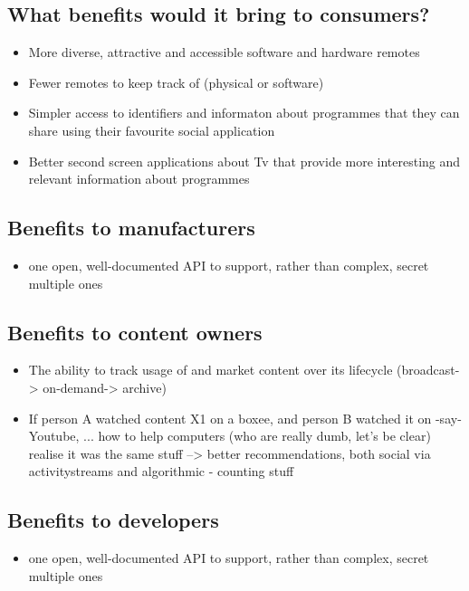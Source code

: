 \documentclass[]{article}%
\begin{document}
\subsection{What benefits would it bring to consumers?}

\begin{itemize}
\item{More diverse, attractive and accessible software and hardware remotes}
\item{Fewer remotes to keep track of (physical or software)}
\item{Simpler access to identifiers and informaton about programmes that they can share using their favourite social application}
\item{Better second screen applications about Tv that provide more interesting and relevant information about programmes}
\end{itemize}

\subsection{Benefits to manufacturers}

\begin{itemize}
\item{one open, well-documented API to support, rather than complex, secret multiple ones}
\end{itemize}

\subsection{Benefits to content owners}

\begin{itemize}
\item{The ability to track usage of and market content over its lifecycle (broadcast-> on-demand-> archive)}
\item{If person A watched content X1 on a boxee, and person B watched it on -say- Youtube, ... how to help computers (who are really dumb, let's be clear) realise it was the same stuff --> better recommendations, both social via activitystreams and algorithmic - counting stuff}
\end{itemize}

\subsection{Benefits to developers}

\begin{itemize}
\item{one open, well-documented API to support, rather than complex, secret multiple ones}
\end{itemize}
\end{document}
